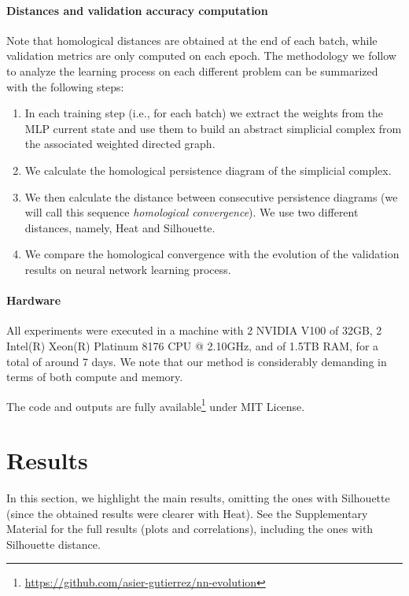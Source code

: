 \documentclass{article}
\begin{document}
\paragraph{Distances and validation accuracy computation} Note that homological distances are obtained at the end of each batch, while validation metrics are only computed on each epoch. The methodology we follow to analyze the learning process on each different problem can be summarized with the following steps:
\begin{enumerate}
    \item In each training step (i.e., for each batch) we extract the weights from the MLP current state and use them to build an abstract simplicial complex from the associated weighted directed graph.
    \item We calculate the homological persistence diagram of the simplicial complex.
    \item We then calculate the distance between consecutive persistence diagrams (we will call this sequence \textit{homological convergence}). We use two different distances, namely, Heat and Silhouette.
    \item We compare the homological convergence with the evolution of the validation results on neural network learning process.  
\end{enumerate} 

\paragraph{Hardware} All experiments were executed in a machine with 2 NVIDIA V100 of 32GB, 2 Intel(R) Xeon(R) Platinum 8176 CPU @ 2.10GHz, and of 1.5TB RAM, for a total of around 7 days. We note that our method is considerably demanding in terms of both compute and memory.

The code and outputs are fully available\footnote{\url{https://github.com/asier-gutierrez/nn-evolution}} under MIT License.

\section{Results}\label{sec:results}

In this section, we highlight the main results, omitting the ones with Silhouette (since the obtained results were clearer with Heat). See the Supplementary Material for the full results (plots and correlations), including the ones with Silhouette distance.%
\end{document}
